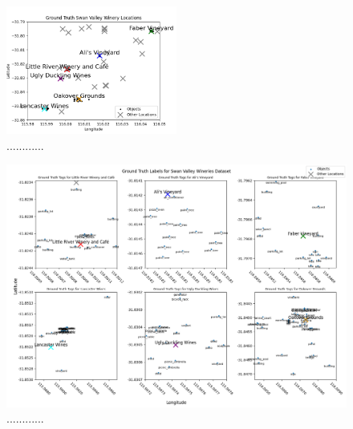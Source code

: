 \begin{figure}[ht]
\label{fig:loc}        
\includegraphics[width=0.5\textwidth]{papers/figures/loc_labels_plot.png}
\centering
\caption[width=\textwidth]{............}
\end{figure}


\begin{figure}[ht]
\label{fig:loc-obj}        
\includegraphics[width=\textwidth]{papers/figures/loc_obj_labels_plot.png}
\centering
\caption[width=\textwidth]{............}
\end{figure}


